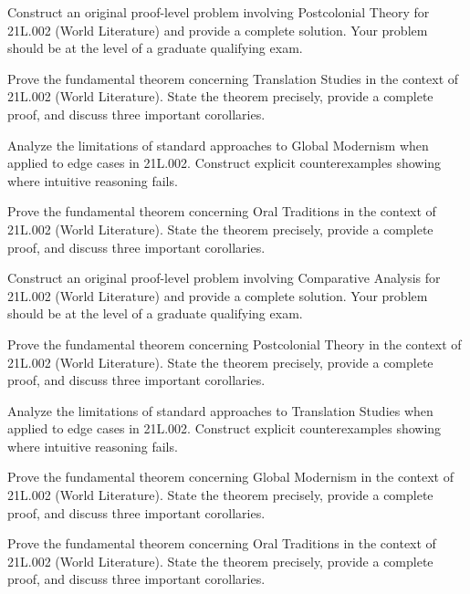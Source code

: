 \documentclass[12pt,a4paper]{exam}
\begin{document}
\begin{questions}
\vspace{0.3cm}

\question[4]
Construct an original proof-level problem involving Postcolonial Theory for 21L.002 (World Literature) and provide a complete solution. Your problem should be at the level of a graduate qualifying exam.

\vspace{0.3cm}

\question[2]
Prove the fundamental theorem concerning Translation Studies in the context of 21L.002 (World Literature). State the theorem precisely, provide a complete proof, and discuss three important corollaries.

\vspace{0.3cm}

\question[5]
Analyze the limitations of standard approaches to Global Modernism when applied to edge cases in 21L.002. Construct explicit counterexamples showing where intuitive reasoning fails.

\vspace{0.3cm}

\question[2]
Prove the fundamental theorem concerning Oral Traditions in the context of 21L.002 (World Literature). State the theorem precisely, provide a complete proof, and discuss three important corollaries.

\vspace{0.3cm}

\question[3]
Construct an original proof-level problem involving Comparative Analysis for 21L.002 (World Literature) and provide a complete solution. Your problem should be at the level of a graduate qualifying exam.

\vspace{0.3cm}

\question[5]
Prove the fundamental theorem concerning Postcolonial Theory in the context of 21L.002 (World Literature). State the theorem precisely, provide a complete proof, and discuss three important corollaries.

\vspace{0.3cm}

\question[3]
Analyze the limitations of standard approaches to Translation Studies when applied to edge cases in 21L.002. Construct explicit counterexamples showing where intuitive reasoning fails.

\vspace{0.3cm}

\question[6]
Prove the fundamental theorem concerning Global Modernism in the context of 21L.002 (World Literature). State the theorem precisely, provide a complete proof, and discuss three important corollaries.

\vspace{0.3cm}

\question[3]
Prove the fundamental theorem concerning Oral Traditions in the context of 21L.002 (World Literature). State the theorem precisely, provide a complete proof, and discuss three important corollaries.

\vspace{0.3cm}

\end{questions}
\end{document}
